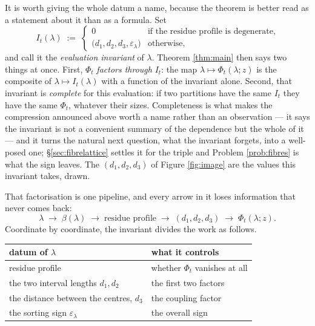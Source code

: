 \documentclass[11pt,reqno]{amsart}
\theoremstyle{plain}
\theoremstyle{definition}
\begin{document}
It is worth giving the whole datum a name, because the theorem is better read as a statement about it
than as a formula. Set
\begin{equation}\label{eq:invariant}
\boxed{\;\;I_t(\lambda)\;:=\;\begin{cases}
0 & \text{if the residue profile is degenerate},\\[2pt]
\bigl(d_1,d_2,d_3,\varepsilon_\lambda\bigr) & \text{otherwise},
\end{cases}\;\;}
\end{equation}
and call it the \emph{evaluation invariant} of $\lambda$. Theorem \ref{thm:main} then says two things
at once. First, $\Phi_t$ \emph{factors through} $I_t$: the map $\lambda\mapsto\Phi_t(\lambda;z)$ is
the composite of $\lambda\mapsto I_t(\lambda)$ with a function of the invariant alone. Second, that
invariant is \emph{complete} for this evaluation: if two partitions have the same $I_t$ they have the
same $\Phi_t$, whatever their sizes. Completeness is what makes the compression announced above worth
a name rather than an observation --- it says the invariant is not a convenient summary of the
dependence but the whole of it --- and it turns the natural next question, what the invariant
forgets, into a well-posed one; \S\ref{sec:fibrelattice} settles it for the triple and Problem
\ref{prob:fibres} is what the sign leaves. The $(d_1,d_2,d_3)$ of Figure
\ref{fig:image} are the values this invariant takes, drawn.

That factorisation is one pipeline, and every arrow in it loses information that never comes back:
\[
\lambda\;\longrightarrow\;\beta(\lambda)\;\longrightarrow\;\text{residue profile}
\;\longrightarrow\;(d_1,d_2,d_3)\;\longrightarrow\;\Phi_t(\lambda;z).
\]
Coordinate by coordinate, the invariant divides the work as follows.

\begin{center}\small
\begin{tabular}{ll}
\toprule
datum of $\lambda$ & what it controls\\
\midrule
residue profile & whether $\Phi_t$ vanishes at all\\
the two interval lengths $d_1,d_2$ & the first two factors\\
the distance between the centres, $d_3$ & the coupling factor\\
the sorting sign $\varepsilon_\lambda$ & the overall sign\\
\bottomrule
\end{tabular}
\end{center}
\end{document}
